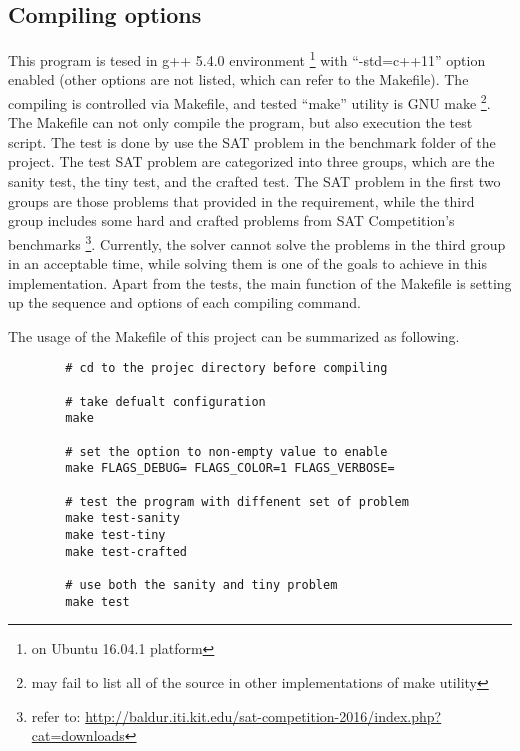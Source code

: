\documentclass[a4paper, 11.5pt]{article}
\begin{document}
\begin{multicols}{2}
    \subsection{Compiling options}

    This program is tesed in g++ 5.4.0 environment \footnote{on Ubuntu 16.04.1 platform} with ``-std=c++11'' option enabled (other options are not listed, which can refer to the Makefile).
    The compiling is controlled via Makefile, and tested ``make'' utility is GNU make
    \footnote{may fail to list all of the source in other implementations of make utility}.
    The Makefile can not only compile the program, but also execution the test script. The test is 
    done by use the SAT problem in the benchmark folder of the project. The test SAT problem are categorized into three groups, which are the sanity test, the tiny test, and the crafted test.
    The SAT problem in the first two groups are those problems that provided in the requirement, while the third group includes some hard and crafted problems from SAT Competition's benchmarks
    \footnote{refer to: \url{http://baldur.iti.kit.edu/sat-competition-2016/index.php?cat=downloads}}.
    Currently, the solver cannot solve the problems in the third group in an acceptable time, while
    solving them is one of the goals to achieve in this implementation. Apart from the tests, the main function of the Makefile is setting up the sequence and options of each compiling command.

    The usage of the Makefile of this project can be summarized as following.
    \\ 

    \begin{tcolorbox}[breakable, blanker, width=\linewidth]
      \begin{verbatim}
        # cd to the projec directory before compiling

        # take defualt configuration
        make

        # set the option to non-empty value to enable 
        make FLAGS_DEBUG= FLAGS_COLOR=1 FLAGS_VERBOSE=

        # test the program with diffenent set of problem
        make test-sanity
        make test-tiny
        make test-crafted

        # use both the sanity and tiny problem
        make test
      \end{verbatim}
    \end{tcolorbox}


\end{multicols}
\end{document}
